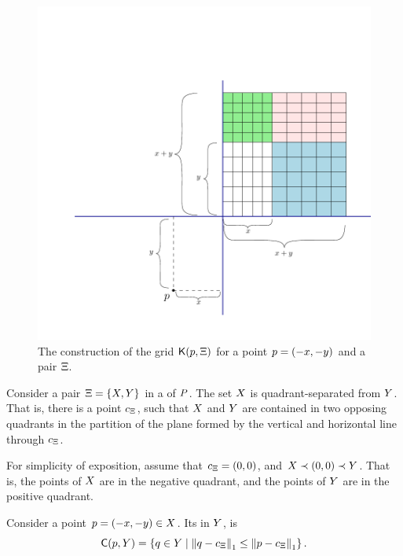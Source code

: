 \documentclass[12pt]{article}%
\begin{document}
\begin{figure}[t]
    \centering%
    \includegraphics{figs/grid_construction}%
    \caption{The construction of the grid $\mathsf{K}(p,\Xi)$ for a
       point $p=(-x,-y)$ and a pair $\Xi$.
    }
\end{figure}

Consider a pair $\Xi = \{X, Y \}$ in a \QSPD of $P$. The set
$X$ is quadrant-separated from $Y$. That is, there is a point
$c_\Xi$, such that $X$ and $Y$ are contained in two
opposing quadrants in the partition of the plane formed by the
vertical and horizontal line through $c_\Xi$.

For simplicity of exposition, assume that $c_\Xi = (0,0)$, and
$X \prec (0,0 ) \prec Y$. That is, the points of $X$ are in
the negative quadrant, and the points of $Y$ are in the positive
quadrant.

Consider a point $p = (-x,-y) \in X$. Its 
in $Y$, is
\begin{equation*}
    \clientsY{\pa}{\PSY}%
    =%
    \Set{ \pb \in \PSY }{ \dZ{1}{\pb}{\cen_\Pair}  \leq
       \dZ{1}{\pa}{\cen_\Pair}}.
\end{equation*}
\end{document}
